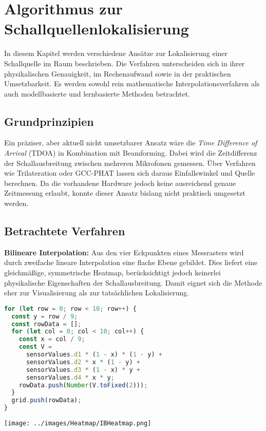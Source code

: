 \chapter{Algorithmus zur Schallquellenlokalisierung}
\label{cha:algorithmus_zur_schallquellenlokalisierung}

In diesem Kapitel werden verschiedene Ansätze zur Lokalisierung einer Schallquelle im Raum beschrieben. Die Verfahren unterscheiden sich in ihrer physikalischen Genauigkeit, im Rechenaufwand sowie in der praktischen Umsetzbarkeit. Es werden sowohl rein mathematische Interpolationsverfahren als auch modellbasierte und lernbasierte Methoden betrachtet.

\section{Grundprinzipien}

Ein präziser, aber aktuell nicht umsetzbarer Ansatz wäre die \textit{Time Difference of Arrival} (TDOA) in Kombination mit Beamforming. Dabei wird die Zeitdifferenz der Schallausbreitung zwischen mehreren Mikrofonen gemessen. Über Verfahren wie Trilateration oder GCC-PHAT lassen sich daraus Einfallswinkel und Quelle berechnen.  
Da die vorhandene Hardware jedoch keine ausreichend genaue Zeitmessung erlaubt, konnte dieser Ansatz bislang nicht praktisch umgesetzt werden.

\section{Betrachtete Verfahren}

\textbf{Bilineare Interpolation:}  
Aus den vier Eckpunkten eines Messrasters wird durch zweifache lineare Interpolation eine flache Ebene gebildet. Dies liefert eine gleichmäßige, symmetrische Heatmap, berücksichtigt jedoch keinerlei physikalische Eigenschaften der Schallausbreitung. Damit eignet sich die Methode eher zur Visualisierung als zur tatsächlichen Lokalisierung.
\begin{lstlisting}[language=JavaScript, caption={Bilineare Interpolation}]
for (let row = 0; row < 10; row++) {
  const y = row / 9;
  const rowData = [];
  for (let col = 0; col < 10; col++) {
    const x = col / 9;
    const V =
      sensorValues.d1 * (1 - x) * (1 - y) +
      sensorValues.d2 * x * (1 - y) +
      sensorValues.d3 * (1 - x) * y +
      sensorValues.d4 * x * y;
    rowData.push(Number(V.toFixed(2)));
  }
  grid.push(rowData);
}
\end{lstlisting}
\begin{minipage}[b]{0.5\textwidth}
  \texttt{[image: ../images/Heatmap/IBHeatmap.png]}
\end{minipage}

